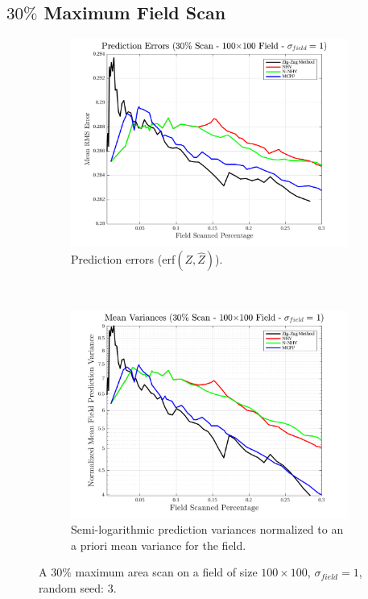 \FloatBarrier
\clearpage
\subsection{$30\%$ Maximum Field Scan}
\begin{figure}[htb!]
    \centering
    \begin{subfigure}[t]{0.65\textwidth}
        \centering
        \includegraphics[width=\linewidth]{figures/hbresults/pred_errs_30p_100x100_sf_1_seed_3.png}
        \captionsetup{skip=0.20\baselineskip,size=footnotesize}
        \caption{Prediction errors (erf$(Z,\hat{Z})$).}
        \label{fig:prederrs_sigma1_p30_s3}
    \end{subfigure}%
    \\
    \begin{subfigure}[t]{0.65\textwidth}
        \centering
        \includegraphics[width=\linewidth]{figures/hbresults/vars_30p_100x100_sf_1_seed_3.png}
        \captionsetup{skip=0.20\baselineskip,size=footnotesize}
        \caption{Semi-logarithmic prediction variances normalized to an a priori mean variance for the field.}
        \label{fig:prederrs_sigma1_p30_s3}
    \end{subfigure}
    \captionsetup{skip=0.20\baselineskip}
    \caption{A $30\%$ maximum area scan on a field of size $100 \times 100$, $\sigma_{field} = 1$, random seed: 3.}
    \label{fig:sigma1_p30_s3}
\end{figure}

